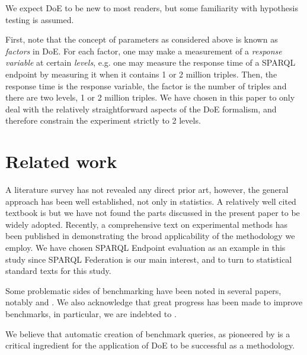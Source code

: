 \documentclass{llncs}
\begin{document}
We expect DoE to be new to most readers, but some familiarity with
hypothesis testing is assumed.

First, note that the concept of parameters as considered above is
known as \emph{factors} in DoE. For each factor, one may make a
measurement of a \emph{response variable} at certain \emph{levels},
e.g. one may measure the response time of a SPARQL endpoint by
measuring it when it contains 1 or 2 million triples. Then, the
response time is the response variable, the factor is the number of
triples and there are two levels, 1 or 2 million triples. We have chosen in
this paper to only deal with the relatively straightforward aspects of
the DoE formalism, and therefore constrain the experiment strictly to
2 levels.





\section{Related work}

A literature survey has not revealed any direct prior art, however, the
general approach has been well established, not only in statistics. A
relatively well cited textbook is \cite{citeulike:5190414} but we have
not found the parts discussed in the present paper to be widely
adopted. Recently, a comprehensive text on experimental methods has
been published in
\cite{Springer-2010-Experimental-Methods-for-the-Analysis-of-Optimization-Algorithms}
demonstrating the broad applicability of the methodology we employ.
We have chosen SPARQL Endpoint evaluation as an example in this study
since SPARQL Federation is our main interest, and to turn to
statistical standard texts \cite{wu2009experiments} for this study.

Some problematic sides of benchmarking have been noted in several
papers, notably \cite{Duan:2011:AOC:1989323.1989340} and
\cite{MontoyaVCRA12}. We also acknowledge that great progress has been
made to improve benchmarks, in particular, we are indebted to
\cite{mxro:Morsey2011DBpedia}.

We believe that automatic creation of benchmark queries, as pioneered
by \cite{goerlitz2012splodge} is a critical ingredient for the
application of DoE to be successful as a methodology.
\end{document}
